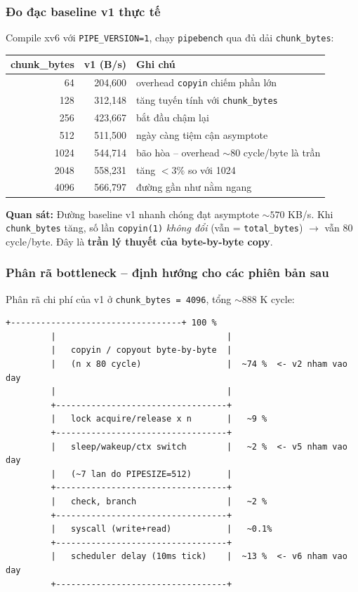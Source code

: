 \documentclass[11pt,a4paper]{article}
\begin{document}
\subsubsection{Đo đạc baseline v1 thực tế}

Compile xv6 với \texttt{PIPE\_VERSION=1}, chạy \texttt{pipebench} qua đủ dải \texttt{chunk\_bytes}:

\begin{center}
\begin{tabularx}{0.95\linewidth}{rrX}
\toprule
\textbf{chunk\_bytes} & \textbf{v1 (B/s)} & \textbf{Ghi chú} \\
\midrule
64    & 204{,}600 & overhead \texttt{copyin} chiếm phần lớn \\
128   & 312{,}148 & tăng tuyến tính với \texttt{chunk\_bytes} \\
256   & 423{,}667 & bắt đầu chậm lại \\
512   & 511{,}500 & ngày càng tiệm cận asymptote \\
1024  & 544{,}714 & bão hòa -- overhead $\sim 80$ cycle/byte là trần \\
2048  & 558{,}231 & tăng $< 3\%$ so với 1024 \\
4096  & 566{,}797 & đường gần như nằm ngang \\
\bottomrule
\end{tabularx}
\end{center}

\textbf{Quan sát:} Đường baseline v1 nhanh chóng đạt asymptote $\sim 570$ KB/s. Khi \texttt{chunk\_bytes} tăng, số lần \texttt{copyin(1)} \emph{không đổi} (vẫn = \texttt{total\_bytes}) $\rightarrow$ vẫn 80 cycle/byte. Đây là \textbf{trần lý thuyết của byte-by-byte copy}.

\subsubsection{Phân rã bottleneck -- định hướng cho các phiên bản sau}

Phân rã chi phí của v1 ở \texttt{chunk\_bytes = 4096}, tổng $\sim 888$ K cycle:

\begin{lstlisting}[style=plain]
         +----------------------------------+ 100 %
         |                                  |
         |   copyin / copyout byte-by-byte  |
         |   (n x 80 cycle)                 |  ~74 %  <- v2 nham vao day
         |                                  |
         +----------------------------------+
         |   lock acquire/release x n       |   ~9 %
         +----------------------------------+
         |   sleep/wakeup/ctx switch        |   ~2 %  <- v5 nham vao day
         |   (~7 lan do PIPESIZE=512)       |
         +----------------------------------+
         |   check, branch                  |   ~2 %
         +----------------------------------+
         |   syscall (write+read)           |   ~0.1%
         +----------------------------------+
         |   scheduler delay (10ms tick)    |  ~13 %  <- v6 nham vao day
         +----------------------------------+
\end{lstlisting}
\end{document}
